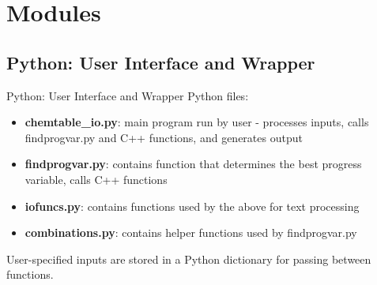 \documentclass{beamer}
\begin{document}
\section{Modules}

\subsection{Python: User Interface and Wrapper}
\begin{frame}{Python: User Interface and Wrapper}
Python files:
\vspace{4pt}
\begin{itemize}
\item \textbf{chemtable\_io.py}: main program run by user - processes inputs, calls findprogvar.py and C++ functions, and generates output %
\vspace{4pt}
\item \textbf{findprogvar.py}: contains function that determines the best progress variable, calls C++ functions
\vspace{4pt}
\item \textbf{iofuncs.py}: contains functions used by the above for text processing
\vspace{4pt}
\item \textbf{combinations.py}: contains helper functions used by findprogvar.py
\end{itemize}
\vspace{12pt}
User-specified inputs are stored in a Python dictionary for passing between functions.


\end{frame}

\end{document}
